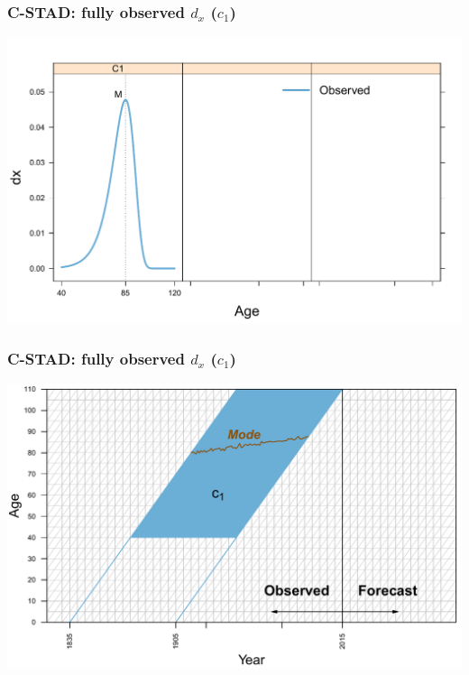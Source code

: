 \documentclass[12pt, xcolor=table]{beamer}  %
\begin{document}
\begin{frame}\frametitle{C-STAD: fully observed $d_x$ ($c_1$)}
	
	\vspace{0.1cm}
	\begin{center}
		\includegraphics[scale=0.56]{Figures/Ch4/F4_c1_new}
	\end{center}
	
\end{frame}

\begin{frame}[noframenumbering]\frametitle{C-STAD: fully observed $d_x$ ($c_1$)}
	
	\vspace{0.4cm}
	\begin{center}
		\includegraphics[scale=0.56]{Figures/Ch4/F5_CSTAD_1_new}
	\end{center}
	
\end{frame}
\end{document}
